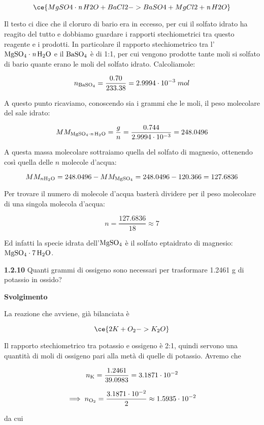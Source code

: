 $$\ce{MgSO4 \cdot \textit{n}\,H2O + BaCl2 -> BaSO4 + MgCl2 + \textit{n}\,H2O}$$

Il testo ci dice che il cloruro di bario era in eccesso, per cui il solfato idrato ha reagito del tutto e dobbiamo guardare i rapporti stechiometrici tra questo reagente e i prodotti. In particolare il rapporto stechiometrico tra l'$\rm MgSO_4 \cdot \textit{n}\,H_2O$ e il $\rm BaSO_4$ è di 1:1, per cui vengono prodotte tante moli si solfato di bario quante erano le moli del solfato idrato. Calcoliamole:

$$n_{\rm BaSO_4}=\frac{0.70}{233.38}
=2.9994 \cdot 10^{-3}\;mol$$

A questo punto ricaviamo, conoscendo sia i grammi che le moli, il peso molecolare del sale idrato:

$$MM_{\rm MgSO_4 \cdot \textit{n}\,H_2O}
=\frac{g}{n}
=\frac{0.744}{2.9994 \cdot 10^{-3}}=248.0496$$

A questa massa molecolare sottraiamo quella del solfato di magnesio, ottenendo così quella delle $n$ molecole d'acqua:

$$MM_{n \rm H_2O}=248.0496 - MM_{\rm MgSO_4}
=248.0496 - 120.366=127.6836$$

Per trovare il numero di molecole d'acqua basterà dividere per il peso molecolare di una singola molecola d'acqua:

$$n=\frac{127.6836}{18} \approx 7$$

Ed infatti la specie idrata dell'$\rm MgSO_4$ è il solfato eptaidrato di magnesio: $\rm MgSO_4 \cdot 7\,H_2O$.

\vspace{0.2cm}\textbf{1.2.10} Quanti grammi di ossigeno sono necessari per trasformare 1.2461 g di potassio in ossido?

\vspace{0.2cm}\large\textbf{Svolgimento}\normalsize

\vspace{0.2cm}La reazione che avviene, già bilanciata è

$$\ce{2K + O_2 -> K_2O}$$

Il rapporto stechiometrico tra potassio e ossigeno è 2:1, quindi servono una quantità di moli di ossigeno pari alla metà di quelle di potassio. Avremo che

$$n_{\rm K}=\frac{1.2461}{39.0983}=3.1871 \cdot 10^{-2}$$

$$\implies n_{\rm O_2}
=\frac{3.1871 \cdot 10^{-2}}{2}
\approx 1.5935 \cdot 10^{-2}$$

da cui

